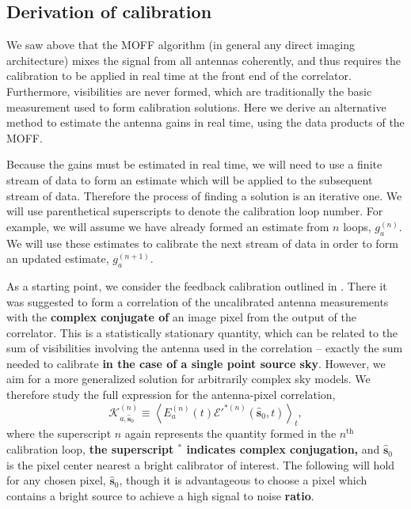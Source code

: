 \documentclass[a4paper,fleqn,usenatbib]{../mnras}
\newcommand{\spix}{\ensuremath{\hat{\mathbf{s}}_{0}}}
\newcommand{\Kna}[1][n]{\ensuremath{\mathcal{K}^{(#1)}_{a,\spix}}}
\begin{document}
\subsection{Derivation of calibration}
We saw above that the MOFF algorithm (in general any direct imaging architecture) mixes the 
signal from all antennas coherently, and thus requires the calibration to be applied in real time 
at the front end of the correlator. Furthermore, visibilities are never formed, which are 
traditionally the basic measurement used to form calibration solutions. Here we derive an 
alternative method to estimate the antenna gains in real time, using the data products of the 
MOFF. 

Because the gains must be estimated in real time, we will need to use a finite stream of data to 
form an estimate which will be applied to the subsequent stream of data. Therefore the 
process of finding a solution is an iterative one. We will use parenthetical superscripts to 
denote the calibration loop number. For example, we will assume we have already formed an 
estimate from $n$ loops, $g^{(n)}_a$. We will use these estimates to calibrate the next stream 
of data in order to form an updated estimate, $g^{(n+1)}_a$.

As a starting point, we consider the feedback calibration outlined in \citealt{mor11}. There it 
was suggested to form a correlation of the uncalibrated antenna measurements with the \textbf{complex conjugate of} an image 
pixel from the output of the correlator. This is a statistically stationary quantity, which can be 
related to the sum of visibilities involving the antenna used in the correlation -- exactly the sum 
needed to calibrate \textbf{in the case of a single point source sky}. However, we aim for a more 
generalized solution for arbitrarily complex sky models. We therefore study the full expression 
for the antenna-pixel correlation,
\begin{equation}\label{eq:Kna_def}
\Kna \equiv \left<E_a^{(n)}(t) \mathcal{E}'^{*(n)}(\spix,t)\right>_t,
\end{equation}
where the superscript $n$ again represents the quantity formed in the $n^\mathrm{th}$ 
calibration loop, 
\textbf{the superscript $^*$ indicates complex conjugation,}
and \spix\, is the pixel center nearest a bright calibrator of interest. The 
following will hold for any chosen pixel, \spix, though it is advantageous to choose a pixel which 
contains a bright source to achieve a high signal to noise \textbf{ratio}. 
\end{document}
